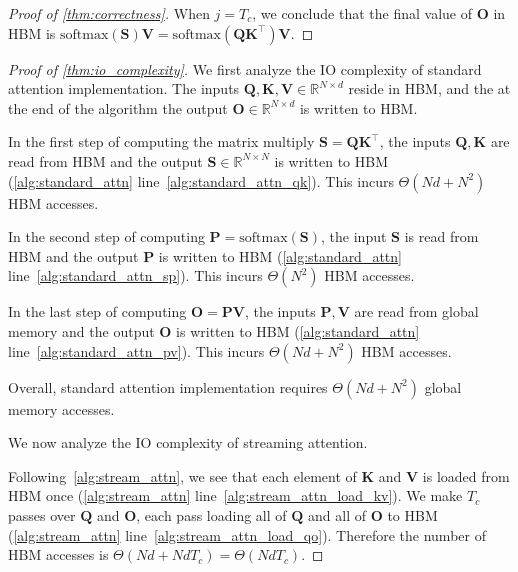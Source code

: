 \documentclass{article}
\newcommand{\softmax}{\mathrm{softmax}}
\newcommand{\vQ}{\mathbf{Q}}
\newcommand{\vK}{\mathbf{K}}
\newcommand{\vV}{\mathbf{V}}
\newcommand{\vS}{\mathbf{S}}
\newcommand{\vP}{\mathbf{P}}
\newcommand{\vO}{\mathbf{O}}
\begin{document}
\begin{proof}[Proof of \cref{thm:correctness}]
  When $j = T_c$, we conclude that the final value of $\vO$ in HBM is
  $\softmax(\vS) \vV = \softmax(\vQ \vK^\top) \vV$.

\end{proof}

\begin{proof}[Proof of \cref{thm:io_complexity}]
  We first analyze the IO complexity of standard attention implementation.
  The inputs $\vQ, \vK, \vV \in \mathbb{R}^{N \times d}$ reside in HBM, and
  the at the end of the algorithm the output $\vO \in \mathbb{R}^{N \times d}$ is
  written to HBM.

  In the first step of computing the matrix multiply $\vS = \vQ \vK^\top$, the inputs $\vQ, \vK$
  are read from HBM and the output $\vS \in \mathbb{R}^{N \times N}$ is
  written to HBM (\cref{alg:standard_attn} line~\ref{alg:standard_attn_qk}).
  This incurs $\Theta(Nd + N^2)$ HBM accesses.

  In the second step of computing $\vP = \softmax(\vS)$, the input $\vS$ is read from
  HBM and the output $\vP$ is written to HBM (\cref{alg:standard_attn} line~\ref{alg:standard_attn_sp}).
  This incurs $\Theta(N^2)$ HBM accesses.

  In the last step of computing $\vO = \vP\vV$, the inputs $\vP, \vV$ are read from global
  memory and the output $\vO$ is written to HBM (\cref{alg:standard_attn} line~\ref{alg:standard_attn_pv}).
  This incurs $\Theta(Nd + N^2)$ HBM accesses.

  Overall, standard attention implementation requires $\Theta(Nd + N^2)$ global
  memory accesses.

  We now analyze the IO complexity of streaming attention.

  Following~\cref{alg:stream_attn}, we see that each element of $\vK$ and $\vV$ is
  loaded from HBM once (\cref{alg:stream_attn} line~\ref{alg:stream_attn_load_kv}).
  We make $T_c$ passes over $\vQ$ and $\vO$, each pass loading all of $\vQ$ and all of
  $\vO$ to HBM (\cref{alg:stream_attn} line~\ref{alg:stream_attn_load_qo}).
  Therefore the number of HBM accesses is
  $\Theta \left( Nd + Nd T_c \right) = \Theta(Nd T_c)$.


\end{proof}
\end{document}
